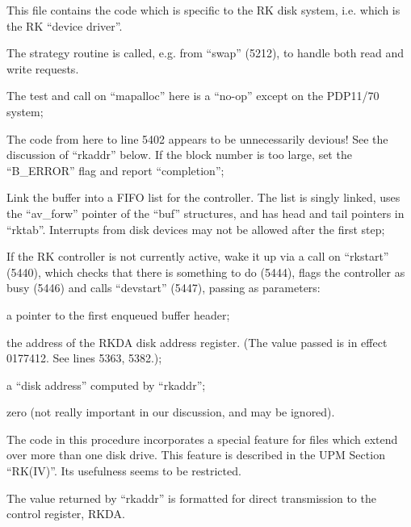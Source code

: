 
This file contains the code which is
specific to the RK disk system, i.e.
which is the RK ``device driver''.



The strategy routine is called, e.g.
from ``swap'' (5212), to handle both read
and write requests.

\bd
\item[5397:] The test and call on ``mapalloc''
 here is a ``no-op'' except on the
 PDP11/70 system;

\item[5399:] The code from here to line 5402
 appears to be unnecessarily devious! See the discussion of
 ``rkaddr'' below. If the block
 number is too large, set the
 ``B\_ERROR'' flag and report ``completion'';

\item[5407:] Link the buffer into a FIFO list
 for the controller. The list is
singly linked, uses the ``av\_forw''
pointer of the ``buf'' structures,
and has head and tail pointers in
``rktab''. Interrupts from disk
devices may not be allowed after
the first step;

\item[5414:] If the RK controller is not
 currently active, wake it up via
 a call on ``rkstart'' (5440), which
 checks that there is something to
 do (5444), flags the controller
 as busy (5446) and calls
 ``devstart'' (5447), passing as
 parameters:

\bi
\item a pointer to the first enqueued
buffer header;

\item the address of the RKDA disk
address register. (The value
passed is in effect 0177412. See
lines 5363, 5382.);

\item a ``disk address'' computed by
``rkaddr'';

\item zero (not really important in our
discussion, and may be ignored).

\ei
\ed



The code in this procedure incorporates
a special feature for files which
extend over more than one disk drive.
This feature is described in the UPM
Section ``RK(IV)''. Its usefulness seems
to be restricted.

The value returned by ``rkaddr'' is formatted for direct transmission to the
control register, RKDA.


